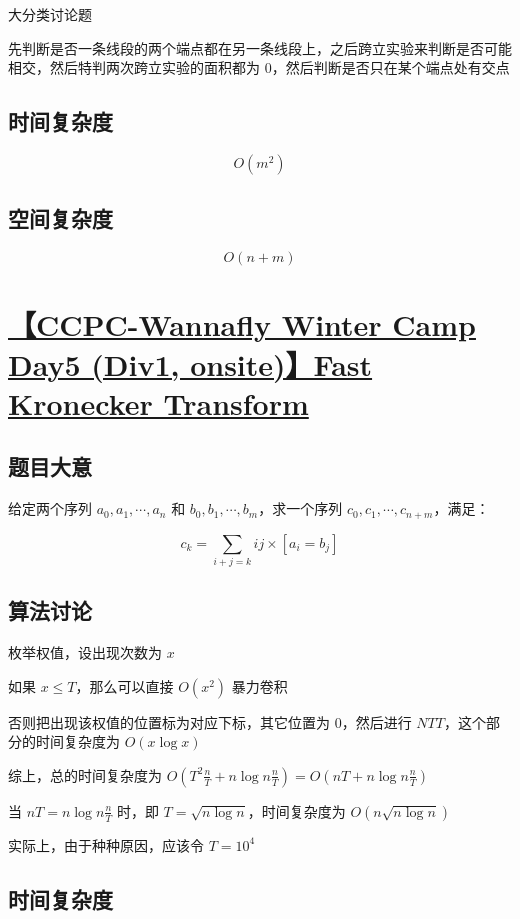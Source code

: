\documentclass[UTF8]{article}
\begin{document}
大分类讨论题

先判断是否一条线段的两个端点都在另一条线段上，之后跨立实验来判断是否可能相交，然后特判两次跨立实验的面积都为 $0$，然后判断是否只在某个端点处有交点

\subsection{时间复杂度}

$$
O(m^2)
$$

\subsection{空间复杂度}

$$
O(n+m)
$$

\section{\href{https://www.zhixincode.com/contest/20/problem/E?problem_id=300}{【CCPC-Wannafly Winter Camp Day5 (Div1, onsite)】Fast Kronecker Transform}}

\subsection{题目大意}

给定两个序列 $a_0,a_1, \cdots, a_n$ 和 $b_0,b_1, \cdots, b_m$，求一个序列 $c_0,c_1, \cdots, c_{n+m}$，满足：

$$
c_{k}=\sum_{i+j=k}ij \times [a_i=b_j]
$$

\subsection{算法讨论}

枚举权值，设出现次数为 $x$

如果 $x \le T$，那么可以直接 $O(x^2)$ 暴力卷积

否则把出现该权值的位置标为对应下标，其它位置为 $0$，然后进行 $NTT$，这个部分的时间复杂度为 $O(x \log x)$

综上，总的时间复杂度为 $O(T^2 \frac{n}{T} + n \log n \frac{n}{T})=O(nT+n \log n \frac{n}{T})$

当 $nT=n \log n \frac{n}{T}$ 时，即 $T=\sqrt{n \log n}$，时间复杂度为 $O(n \sqrt {n \log n})$

实际上，由于种种原因，应该令 $T=10^4$

\subsection{时间复杂度}
\end{document}
